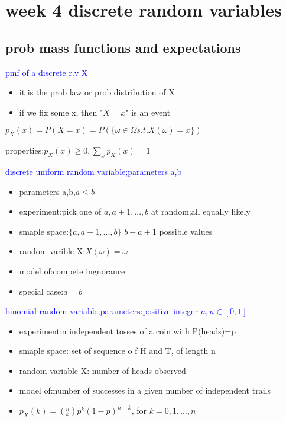 \section*{week 4 discrete random variables}

\subsection*{prob mass functions and expectations}

\textcolor{blue}{pmf of a discrete r.v X}

\begin{itemize}
    \item it is the prob law or prob distribution of X
    \item if we fix some x, then "$X=x$" is an event
\end{itemize}

$p_X(x)=P(X=x)=P(\{\omega \in \Omega s.t. X(\omega)=x\})$

properties:$p_X(x)\geq 0,\sum_xp_X(x)=1$

\textcolor{blue}{discrete uniform random variable;parameters a,b}

\begin{itemize}
    \item parameters a,b,$a\leq b$
    \item experiment:pick one of $a,a+1,...,b$ at random;all equally likely
    \item smaple space:$\{a,a+1,...,b\}$ $b-a+1$ possible values
    \item random varible X:$X(\omega)=\omega$
    \item model of:compete ingnorance
    \item special case:$a=b$
\end{itemize}

\textcolor{blue}{binomial random variable;parameters:positive integer $n,n \in [0, 1]$}

\begin{itemize}
    \item experiment:n independent tosses of a coin with P(heads)=p
    \item smaple space: set of sequence o f H and T, of length n
    \item random variable X: number of heads observed
    \item model of:number of successes in a given number of independent trails
    \item $p_X(k)=(^n_k)p^k(1-p)^{n-k}$, for $k=0,1,...,n$ 
\end{itemize}


